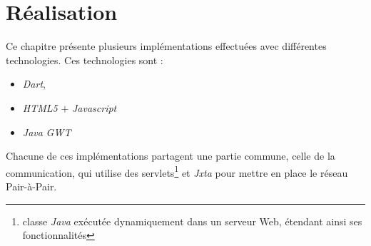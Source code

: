 \chapter{Réalisation}
  Ce chapitre présente plusieurs implémentations effectuées avec différentes
  technologies. Ces technologies sont :
  \begin{itemize}
    \item \emph{Dart},
    \item \emph{HTML5} $+$ \emph{Javascript}
    \item \emph{Java} \emph{GWT}
  \end{itemize}
  Chacune de ces implémentations partagent une partie commune, celle de la
  communication, qui utilise des servlets\footnote{classe \emph{Java} exécutée
  dynamiquement dans un serveur Web, étendant ainsi ses fonctionnalités} et
  \emph{Jxta} pour mettre en place le réseau Pair-à-Pair.

  

  

  

